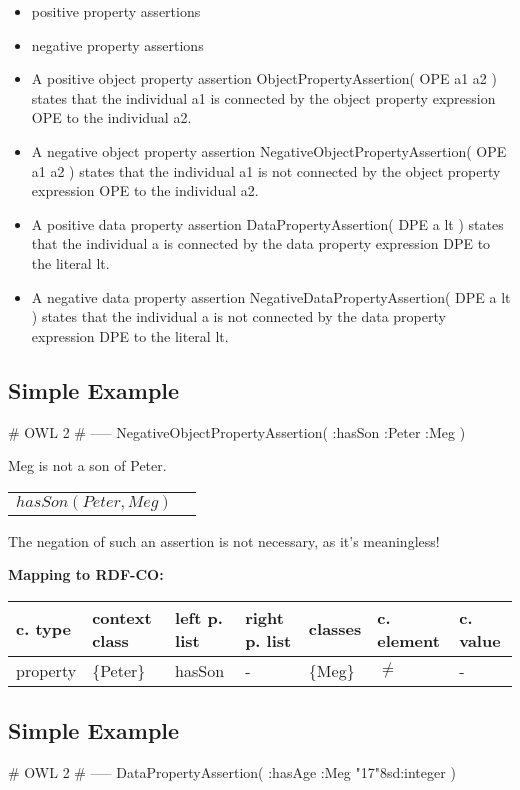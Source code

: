 \documentclass{llncs}
\newenvironment{gcotable}{
  \scriptsize
  \sffamily
  \vspace{0cm}
	\begin{center}
	\textbf{\vspace{0.4cm}Mapping to RDF-CO:} \\
  \begin{tabular}{l|l|l|l|l|l|l}
	\hline
  \textbf{c. type} & \textbf{context class} & \textbf{left p. list} & \textbf{right p. list} & \textbf{classes} & \textbf{c. element} & \textbf{c. value} \\
  \hline

}{
  \hline
  \end{tabular}
	\end{center}
}
\newenvironment{DL}{
  \vspace{0cm}
	\begin{center}
  \begin{tabular}{r l}

}{
  \end{tabular}
	\end{center}
}
\begin{document}
\begin{itemize}
	\item positive property assertions
  \item negative property assertions
	\item A positive object property assertion ObjectPropertyAssertion( OPE a1 a2 ) states that the individual a1 is connected by the object property expression OPE to the individual a2. 
	\item A negative object property assertion NegativeObjectPropertyAssertion( OPE a1 a2 ) states that the individual a1 is not connected by the object property expression OPE to the individual a2. 
	\item A positive data property assertion DataPropertyAssertion( DPE a lt ) states that the individual a is connected by the data property expression DPE to the literal lt. 
	\item A negative data property assertion NegativeDataPropertyAssertion( DPE a lt ) states that the individual a is not connected by the data property expression DPE to the literal lt.
\end{itemize}

\subsection{Simple Example}

\begin{ex}
# OWL 2
# -----
NegativeObjectPropertyAssertion( :hasSon :Peter :Meg )
\end{ex}

Meg is not a son of Peter.

\begin{DL}
$hasSon(Peter,Meg)$\\
\end{DL}

The negation of such an assertion is not necessary, as it's meaningless!

\begin{gcotable}
property & \{Peter\} & hasSon & - & \{Meg\} & $\neq$ & - \\
\end{gcotable}

\subsection{Simple Example}

\begin{ex}
# OWL 2
# -----
DataPropertyAssertion( :hasAge :Meg "17"^^xsd:integer )
\end{ex}
\end{document}
